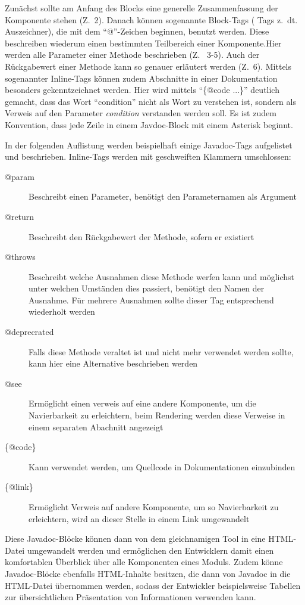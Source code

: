 Zunächst sollte am Anfang des Blocks eine generelle Zusammenfassung der Komponente stehen  (Z.~2). Danach können sogenannte Block-Tags ( Tags z.~dt. Auszeichner), die mit dem \enquote{@}-Zeichen beginnen, benutzt werden. Diese beschreiben wiederum einen bestimmten Teilbereich einer Komponente.Hier werden alle Parameter einer Methode beschrieben (Z.~ 3-5). Auch der Rückgabewert einer Methode kann so genauer erläutert werden (Z.~6). Mittels sogenannter Inline-Tags können zudem Abschnitte in einer Dokumentation besonders gekenntzeichnet werden. Hier wird mittels \enquote{\{@code ...\}} deutlich gemacht, dass das Wort \enquote{condition} nicht als Wort zu verstehen ist, sondern als Verweis auf den Parameter \textit{condition} verstanden werden soll. Es ist zudem Konvention, dass jede Zeile in einem Javdoc-Block mit einem Asterisk beginnt. 

In der folgenden Auflistung werden beispielhaft einige Javadoc-Tags aufgelistet und beschrieben. Inline-Tags werden mit geschweiften Klammern umschlossen:
\begin{description}
         \item[@param]  Beschreibt einen Parameter, benötigt den Parameternamen als Argument
         \item[@return]  Beschreibt den Rückgabewert der Methode, sofern er existiert 
         \item[@throws] Beschreibt welche Ausnahmen diese Methode werfen kann und möglichst unter welchen Umständen dies passiert, benötigt den Namen der Ausnahme. Für mehrere Ausnahmen sollte dieser Tag entsprechend wiederholt werden 
         \item[@deprecrated] Falls diese Methode veraltet ist und nicht mehr verwendet werden sollte, kann hier eine Alternative beschrieben werden
         \item[@see] Ermöglicht einen verweis auf eine andere Komponente, um die Navierbarkeit zu erleichtern, beim Rendering werden diese Verweise in einem separaten Abachnitt angezeigt
         \item[\{@code\}] Kann verwendet werden, um Quellcode in Dokumentationen einzubinden
         \item [\{@link\}] Ermöglicht Verweis auf andere Komponente, um so Navierbarkeit zu erleichtern, wird an dieser Stelle in einem Link umgewandelt
        
\end{description}



Diese Javadoc-Blöcke können dann von dem gleichnamigen Tool in eine HTML-Datei umgewandelt werden und ermöglichen den Entwicklern damit einen komfortablen Überblick über alle Komponenten eines Moduls. Zudem könne Javadoc-Blöcke ebenfalls HTML-Inhalte besitzen, die dann von Javadoc in die HTML-Datei übernommen werden, sodass der Entwickler beispielsweise Tabellen zur übersichtlichen Präsentation  von Informationen verwenden kann. 

